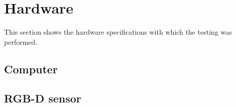 \chapter{Hardware }
This section shows the hardware specifications with which the testing was performed. 

\section{Computer}

\section{RGB-D sensor}

